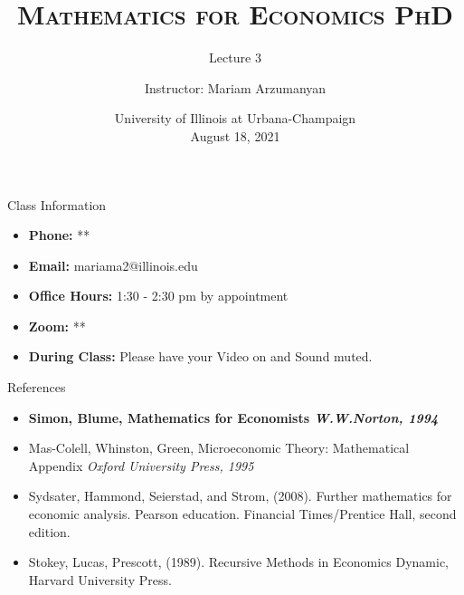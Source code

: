 \documentclass{beamer}
\title{\textsc{Mathematics for Economics PhD}}
\subtitle{Lecture 3}
\author{Instructor:  Mariam Arzumanyan}
\date[UIUC, Fall 2021]{University of Illinois at Urbana-Champaign \\August 18, 2021 }
\begin{document}
\begin{frame}
  \titlepage
\end{frame}

\begin{frame}{Class Information}
\begin{itemize}
  
    \item \textbf{Phone:} **
    \item \textbf{Email:} mariama2@illinois.edu
\item \textbf{Office Hours:}  1:30 - 2:30 pm  by appointment
\item \textbf{Zoom: } ** 
\item \textbf{During Class:} Please have your Video on and Sound muted. 

\end{itemize}

\end{frame}
\begin{frame}{References}
	\begin{itemize}

\item	\textbf{Simon, Blume, Mathematics for Economists \textit{W.W.Norton, 1994}}
\item	Mas-Colell, Whinston, Green, Microeconomic Theory: Mathematical Appendix \textit{Oxford University Press,  1995 }
\item		Sydsater, Hammond, Seierstad, and Strom, (2008). Further mathematics for economic analysis. Pearson education. Financial Times/Prentice Hall, second edition.
\item		Stokey, Lucas, Prescott, (1989). Recursive Methods in Economics Dynamic, Harvard University Press.

 \end{itemize}   
\end{frame}
\end{document}

